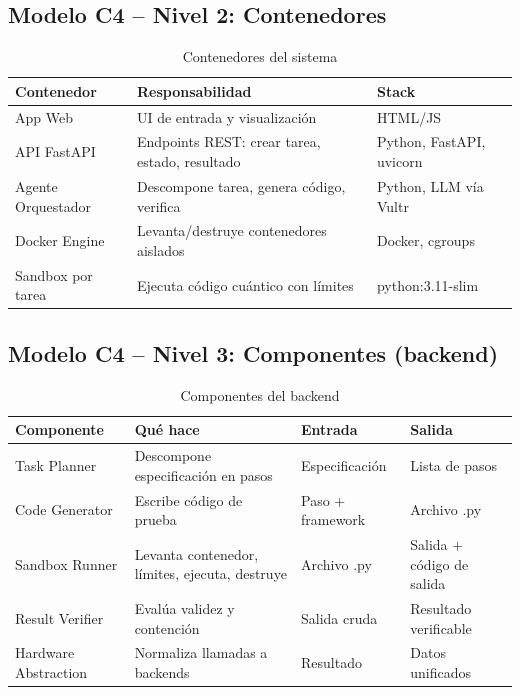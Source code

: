 \documentclass[11pt,a4paper]{article}
\begin{document}
\subsection{Modelo C4 -- Nivel 2: Contenedores}

\begin{table}[h]
\centering
\begin{tabular}{lll}
\toprule
\textbf{Contenedor} & \textbf{Responsabilidad} & \textbf{Stack} \\
\midrule
App Web & UI de entrada y visualización & HTML/JS \\
API FastAPI & Endpoints REST: crear tarea, estado, resultado & Python, FastAPI, uvicorn \\
Agente Orquestador & Descompone tarea, genera código, verifica & Python, LLM vía Vultr \\
Docker Engine & Levanta/destruye contenedores aislados & Docker, cgroups \\
Sandbox por tarea & Ejecuta código cuántico con límites & python:3.11-slim \\
\bottomrule
\end{tabular}
\caption{Contenedores del sistema}
\end{table}

\subsection{Modelo C4 -- Nivel 3: Componentes (backend)}

\begin{table}[h]
\centering
\begin{tabular}{llll}
\toprule
\textbf{Componente} & \textbf{Qué hace} & \textbf{Entrada} & \textbf{Salida} \\
\midrule
Task Planner & Descompone especificación en pasos & Especificación & Lista de pasos \\
Code Generator & Escribe código de prueba & Paso + framework & Archivo .py \\
Sandbox Runner & Levanta contenedor, límites, ejecuta, destruye & Archivo .py & Salida + código de salida \\
Result Verifier & Evalúa validez y contención & Salida cruda & Resultado verificable \\
Hardware Abstraction & Normaliza llamadas a backends & Resultado & Datos unificados \\
\bottomrule
\end{tabular}
\caption{Componentes del backend}
\end{table}
\end{document}
